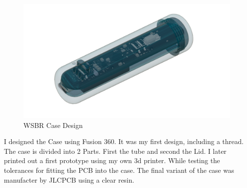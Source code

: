  \begin{figure}[H]
	\centering
	\includegraphics[width=16cm]{2_Documentation/Documentation_Wireless_ScoreBoard_Remote/Resources/WSBR_Case v8.png}
	\caption{WSBR Case Design}
	\label{fig:WSBR Case Design}
\end{figure}

I designed the Case using Fusion 360. It was my first design, including a thread. The case is divided into 2 Parts. First the tube and second the Lid. I later printed out a first prototype using my own 3d printer. While testing the tolerances for fitting the PCB into the case. The final variant of the case was manufacter by JLCPCB using a clear resin.
